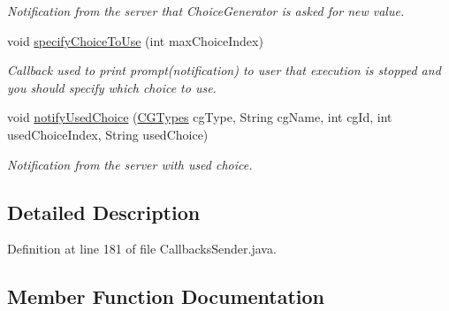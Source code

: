 \begin{DoxyCompactItemize}
\begin{DoxyCompactList}\small\item\em Notification from the server that Choice\+Generator is asked for new value. \end{DoxyCompactList}\item 
void \hyperlink{classgov_1_1nasa_1_1jpf_1_1inspector_1_1server_1_1callbacks_1_1_callbacks_sender_1_1_callbacks_serializer_a47221e0bce9b86566439719e6ae667b1}{specify\+Choice\+To\+Use} (int max\+Choice\+Index)
\begin{DoxyCompactList}\small\item\em Callback used to print prompt(notification) to user that execution is stopped and you should specify which choice to use. \end{DoxyCompactList}\item 
void \hyperlink{classgov_1_1nasa_1_1jpf_1_1inspector_1_1server_1_1callbacks_1_1_callbacks_sender_1_1_callbacks_serializer_ad5bbe59d8f6b40222c374182751430cc}{notify\+Used\+Choice} (\hyperlink{enumgov_1_1nasa_1_1jpf_1_1inspector_1_1interfaces_1_1_choice_generators_interface_1_1_c_g_types}{C\+G\+Types} cg\+Type, String cg\+Name, int cg\+Id, int used\+Choice\+Index, String used\+Choice)
\begin{DoxyCompactList}\small\item\em Notification from the server with used choice. \end{DoxyCompactList}\end{DoxyCompactItemize}


\subsection{Detailed Description}


Definition at line 181 of file Callbacks\+Sender.\+java.



\subsection{Member Function Documentation}
